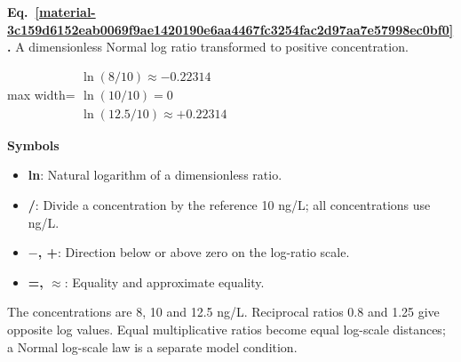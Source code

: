 \documentclass[11pt,a4paper]{article}
\begin{document}
\par\medskip
\begin{samepage}
\label{material-3c159d6152eab0069f9ae1420190e6aa4467fc3254fac2d97aa7e57998ec0bf0}
\noindent\textbf{Eq.~\ref*{material-3c159d6152eab0069f9ae1420190e6aa4467fc3254fac2d97aa7e57998ec0bf0}.} A dimensionless Normal log ratio transformed to positive concentration.\par\nopagebreak
\begin{center}\begin{adjustbox}{max width=\linewidth}$\displaystyle \begin{gathered}\ln(8/10)\approx-0.22314\\\ln(10/10)=0\\\ln(12.5/10)\approx+0.22314\end{gathered}$\end{adjustbox}\end{center}

\par\noindent\textbf{Symbols}

\begin{itemize}\setlength{\itemsep}{1pt}\setlength{\parsep}{0pt}
\item \textbf{ln}: Natural logarithm of a dimensionless ratio.
\item \textbf{/}: Divide a concentration by the reference 10 ng/L; all concentrations use ng/L.
\item \textbf{\ensuremath{-}, +}: Direction below or above zero on the log-ratio scale.
\item \textbf{=, \ensuremath{\approx}}: Equality and approximate equality.
\end{itemize}

The concentrations are 8, 10 and 12.5 ng/L. Reciprocal ratios 0.8 and 1.25 give opposite log values. Equal multiplicative ratios become equal log-scale distances; a Normal log-scale law is a separate model condition.

\end{samepage}
\medskip
\end{document}
